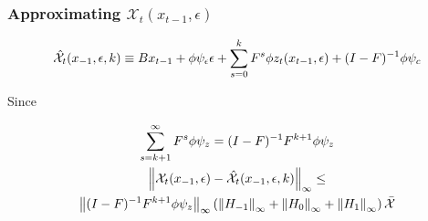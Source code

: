 \documentclass[tikz]{beamer}
\begin{document}
\begin{frame}
\frametitle{Approximating $\mathcal{X}_t(x_{t-1},\epsilon)$} 

 	 \begin{gather}
 	 \hat{\mathcal{X}}_{t}(x_{-1},\epsilon,k) \equiv B x_{t-1}+ \phi \psi_\epsilon\epsilon + \sum_{s=0}^k F^s \phi z_{t}(x_{t-1},\epsilon) + (I - F)^{-1} \phi \psi_c \label{theTruncSeries}
 \end{gather}

Since
{\small
    \begin{gather}
      \label{eq:1}
\sum_{s=k+1}^{\infty} F^s \phi \psi_z = (I -F)^{-1} F^{k+1}\phi \psi_z       \\
\left\lVert\mathcal{X}_{t}(x_{-1},\epsilon)-\hat{\mathcal{X}}_{t}(x_{-1},\epsilon,k)\right\rVert_\infty \le\\ \left\lVert(I -F)^{-1} F^{k+1}\phi \psi_z\right\rVert_\infty \left ( \left\lVert H_{-1} \right\rVert_\infty+ \left\lVert H_{0} \right\rVert_\infty+ \left\lVert H_{1} \right\rVert_\infty \right )\bar{\mathcal{X}}
    \end{gather}

}
\end{frame}
\end{document}
